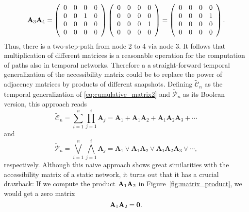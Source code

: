 \begin{equation}\label{eq:matrix_multi_example}
\mat{A}_3 \mat{A}_4=\left( \begin{array}{cccc}%
0 & 0 & 0 & 0 \\
 0 & 0 & 1 & 0 \\
0 & 0 & 0 & 0 \\
0 & 0 & 0 & 0 \end{array} \right)%
\left( \begin{array}{cccc}%
0 & 0 & 0 & 0 \\
 0 & 0 & 0 & 0 \\
0 & 0 & 0 & 1 \\
0 & 0 & 0 & 0 \end{array} \right)%
=%
\left( \begin{array}{cccc}%
0 & 0 & 0 & 0 \\
 0 & 0 & 0 & 1 \\
0 & 0 & 0 & 0 \\
0 & 0 & 0 & 0 \end{array} \right).%
\end{equation}
Thus, there is a two-step-path from node 2 to 4 via node 3.
It follows that multiplication of different matrices is a reasonable operation for the computation of paths also in temporal networks.
Therefore a a straight-forward temporal generalization of the accessibility matrix could be to replace the power of adjacency matrices by products of different snapshots.
Defining $\tilde{\mathcal{C}}_n$ as the temporal generalization of \eqref{eq:cumulative_matrix2} and $\tilde{\mathcal{P}}_n$ as its Boolean version, this approach reads
\begin{equation*}%
\tilde{\mathcal{C}}_n= \sum _{i=1} ^n \prod _{j=1} ^i \mathbf{A}_j = \mathbf{A}_1 + \mathbf{A}_1 \mathbf{A}_2 + \mathbf{A}_1 \mathbf{A}_2 \mathbf{A}_3 + \cdots
\end{equation*}
and
\begin{equation}\label{eq:wrong_access}
\tilde{\mathcal{P}}_n= \bigvee _{i=1} ^n \bigwedge _{j=1} ^i \mathbf{A}_j = \mathbf{A}_1 \vee \mathbf{A}_1 \mathbf{A}_2 \vee \mathbf{A}_1 \mathbf{A}_2 \mathbf{A}_3 \vee \cdots ,
\end{equation}
respectively.
Although this naive approach shows great similarities with the accessibility matrix of a static network, it turns out that it has a crucial drawback:
If we compute the product $\mathbf{A}_1 \mathbf{A}_2$ in Figure~\ref{fig:matrix_product}, we would get a zero matrix
\begin{equation}\label{eq:zero_matrix_product}
\mathbf{A}_1 \mathbf{A}_2 = \mathbf{0} .
\end{equation}
